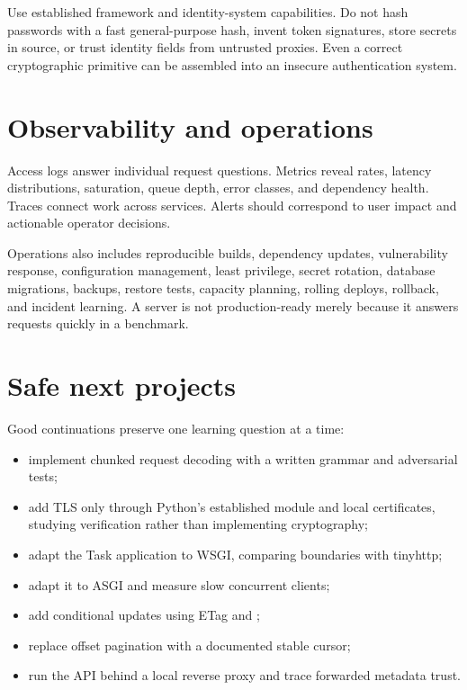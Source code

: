 Use established framework and identity-system capabilities. Do not hash passwords
with a fast general-purpose hash, invent token signatures, store secrets in source,
or trust identity fields from untrusted proxies. Even a correct cryptographic
primitive can be assembled into an insecure authentication system.

\section{Observability and operations}

Access logs answer individual request questions. Metrics reveal rates, latency
distributions, saturation, queue depth, error classes, and dependency health.
Traces connect work across services. Alerts should correspond to user impact and
actionable operator decisions.

Operations also includes reproducible builds, dependency updates, vulnerability
response, configuration management, least privilege, secret rotation, database
migrations, backups, restore tests, capacity planning, rolling deploys, rollback,
and incident learning. A server is not production-ready merely because it answers
requests quickly in a benchmark.

\section{Safe next projects}

Good continuations preserve one learning question at a time:

\begin{itemize}
  \item implement chunked request decoding with a written grammar and adversarial tests;
  \item add TLS only through Python's established  module and local certificates,
        studying verification rather than implementing cryptography;
  \item adapt the Task application to WSGI, comparing boundaries with tinyhttp;
  \item adapt it to ASGI and measure slow concurrent clients;
  \item add conditional updates using ETag and ;
  \item replace offset pagination with a documented stable cursor;
  \item run the API behind a local reverse proxy and trace forwarded metadata trust.
\end{itemize}

